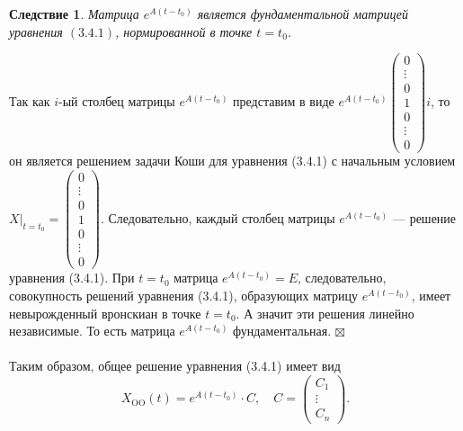 \documentclass[a4paper, 12pt]{report}
\newenvironment{Proof} %
{\par\noindent{$\blacklozenge$}} %
{\hfill$\scriptstyle\boxtimes$}
\newtheorem*{cor}{Следствие}
\begin{document}
\begin{cor}
	Матрица $e^{A(t-t_0)}$ является фундаментальной матрицей уравнения $(3.4.1)$, нормированной в точке $t =t_0$.
\end{cor}\begin{Proof}
Так как $i$-ый столбец матрицы $e^{A(t-t_0)}$ представим в виде $e^{A(t-t_0)}\begin{pmatrix}
	0\\\vdots\\0\\1\\0\\\vdots\\0
\end{pmatrix}i$, то он является решением задачи Коши для уравнения (3.4.1) с начальным условием $X|_{t=t_0} = \begin{pmatrix}
0\\\vdots\\0\\1\\0\\\vdots\\0
\end{pmatrix}$. Следовательно, каждый столбец матрицы $e^{A(t-t_0)}$ --- решение уравнения (3.4.1). При $t=t_0$ матрица $e^{A(t-t_0)} = E$, следовательно, совокупность решений уравнения (3.4.1), образующих матрицу $e^{A(t-t_0)}$, имеет невырожденный вронскиан в точке $t=t_0$. А значит эти решения линейно независимые. То есть матрица $e^{A(t-t_0)}$ фундаментальная. 
\end{Proof}\\\\
Таким образом, общее решение уравнения (3.4.1) имеет вид $$X_\text{OO}(t) = e^{A(t-t_0)}\cdot C,\quad C = \begin{pmatrix}
	C_1\\\vdots\\C_n
\end{pmatrix}.$$
\end{document}
